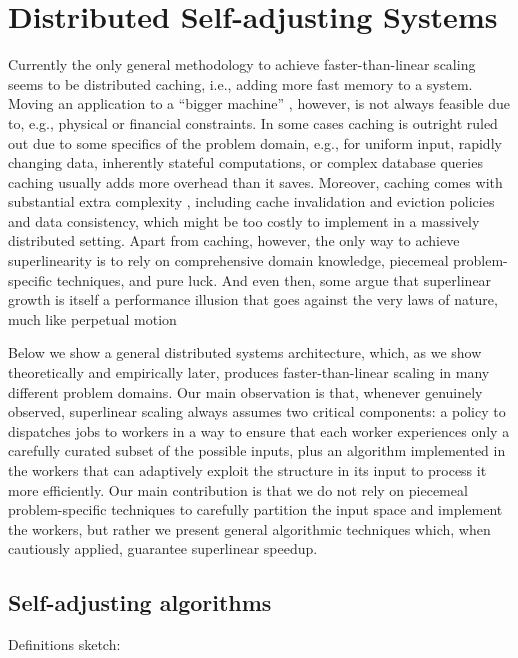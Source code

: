 \section{Distributed Self-adjusting Systems}
\label{sec:architecture}

Currently the only general methodology to achieve faster-than-linear scaling seems to be distributed caching, i.e., adding more fast memory to a system. Moving an application to a ``bigger machine'' \cite{dobb-2}, however, is not always feasible due to, e.g., physical or financial constraints.  In some cases caching is outright ruled out due to some specifics of the problem domain, e.g., for uniform input, rapidly changing data, inherently stateful computations, or complex database queries caching usually adds more overhead than it saves. Moreover, caching comes with substantial extra complexity \cite{271208}, including cache invalidation and eviction policies and data consistency, which might be too costly to implement in a massively distributed setting. Apart from caching, however, the only way to achieve superlinearity is to rely on comprehensive domain knowledge, piecemeal problem-specific techniques, and pure luck. And even then, some argue that superlinear growth is itself a performance illusion that goes against the very laws of nature, much like perpetual motion \cite{gunther-hotsos, 10.1145/2773212.2789974}

Below we show a general distributed systems architecture, which, as we show theoretically and empirically later, produces faster-than-linear scaling in many different problem domains. Our main observation is that, whenever genuinely observed, superlinear scaling always assumes two critical components: a policy to dispatches jobs to workers in a way to ensure that each worker experiences only a carefully curated subset of the possible inputs, plus an algorithm implemented in the workers that can adaptively exploit the structure in its input to process it more efficiently. Our main contribution is that we do not rely on piecemeal problem-specific techniques to carefully partition the input space and implement the workers, but rather we present general algorithmic techniques which, when cautiously applied, guarantee superlinear speedup.

\subsection{Self-adjusting algorithms}
\label{sec:sa-alg}


Definitions sketch:

